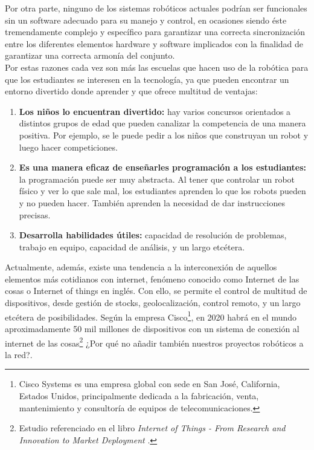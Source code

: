 \documentclass[a4paper,12pt]{article}
\begin{document}
Por otra parte, ninguno de los sistemas robóticos actuales podrían ser funcionales sin un software adecuado para su manejo y control, en ocasiones siendo éste tremendamente complejo y específico para garantizar
una correcta sincronización entre los diferentes elementos hardware y software implicados con la finalidad de garantizar una correcta armonía del conjunto.\\

Por estas razones cada vez son más las escuelas que hacen uso de la robótica para que los estudiantes se interesen en la tecnología, ya que pueden encontrar un entorno divertido donde aprender y que ofrece multitud de ventajas:\\

\begin{enumerate}
\item \textbf{Los niños lo encuentran divertido:} hay varios concursos orientados a distintos grupos de edad que pueden canalizar la competencia de una manera positiva. Por ejemplo, se le puede pedir a los niños que construyan un robot y luego hacer competiciones.\\
\item \textbf{Es una manera eficaz de enseñarles programación a los estudiantes:}
 la programación puede ser muy abstracta. Al tener que controlar un robot físico y ver lo que sale mal, los estudiantes aprenden lo que los robots pueden y no pueden hacer. 
También aprenden la necesidad de dar instrucciones precisas.\\
\item \textbf{ Desarrolla habilidades útiles:}
 capacidad de resolución de problemas, trabajo en equipo, capacidad de análisis, y un largo etcétera.
\end{enumerate}


Actualmente, además, existe una tendencia a la interconexión de aquellos elementos más cotidianos con internet, fenómeno conocido como Internet de las cosas o Internet of things en inglés. Con ello,
se permite el control de multitud de dispositivos, desde gestión de stocks, geolocalización, control remoto, y un largo etcétera de posibilidades. Según la empresa Cisco\footnote{Cisco Systems es 
una empresa global con sede en San José, California, Estados Unidos, principalmente dedicada a la fabricación, venta, mantenimiento y consultoría de equipos de telecomunicaciones.}, en 2020 habrá en
el mundo aproximadamente 50 mil millones de dispositivos con un sistema de conexión al internet de las cosas\footnote{ Estudio referenciado en el libro \textit{Internet of Things - From Research and Innovation to Market Deployment} 
\cite{book:internet_things}.} ¿Por qué no añadir también nuestros proyectos robóticos a la red?.\\
\end{document}
